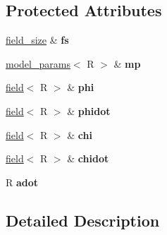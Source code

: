 \subsection*{Protected Attributes}
\begin{DoxyCompactItemize}
\item 
\hypertarget{classdefrost__style__initializer_a685da95d63057c41972961f82b1c7f8e}{
\hyperlink{structfield__size}{field\_\-size} \& {\bfseries fs}}
\label{classdefrost__style__initializer_a685da95d63057c41972961f82b1c7f8e}

\item 
\hypertarget{classdefrost__style__initializer_a02db3328866900fc1d54e419e4d0f9e1}{
\hyperlink{structmodel__params}{model\_\-params}$<$ R $>$ \& {\bfseries mp}}
\label{classdefrost__style__initializer_a02db3328866900fc1d54e419e4d0f9e1}

\item 
\hypertarget{classdefrost__style__initializer_a11f22b34b8b64a1b17c809afbfb65f3b}{
\hyperlink{classfield}{field}$<$ R $>$ \& {\bfseries phi}}
\label{classdefrost__style__initializer_a11f22b34b8b64a1b17c809afbfb65f3b}

\item 
\hypertarget{classdefrost__style__initializer_a27a44a23c3b13965cbb0eedfd585c835}{
\hyperlink{classfield}{field}$<$ R $>$ \& {\bfseries phidot}}
\label{classdefrost__style__initializer_a27a44a23c3b13965cbb0eedfd585c835}

\item 
\hypertarget{classdefrost__style__initializer_a50d49a930e6fa3679ba613136b57e36a}{
\hyperlink{classfield}{field}$<$ R $>$ \& {\bfseries chi}}
\label{classdefrost__style__initializer_a50d49a930e6fa3679ba613136b57e36a}

\item 
\hypertarget{classdefrost__style__initializer_a0a593b6c1db46eae370a21cc88b89c23}{
\hyperlink{classfield}{field}$<$ R $>$ \& {\bfseries chidot}}
\label{classdefrost__style__initializer_a0a593b6c1db46eae370a21cc88b89c23}

\item 
\hypertarget{classdefrost__style__initializer_a218c42e966ea3eb4abd8d71d7a31d4e7}{
R {\bfseries adot}}
\label{classdefrost__style__initializer_a218c42e966ea3eb4abd8d71d7a31d4e7}

\end{DoxyCompactItemize}


\subsection{Detailed Description}
